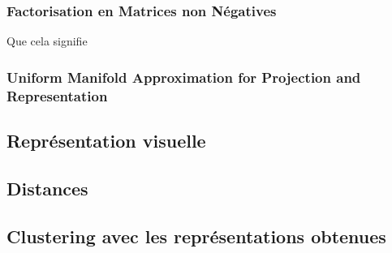 \subsubsection{Factorisation en Matrices non Négatives}
Que cela signifie
\subsubsection{Uniform Manifold Approximation for Projection and Representation }
\subsection{Représentation visuelle}
\subsection{Distances}

\label{red}
\subsection{Clustering avec les représentations obtenues}
\label{clustering}
